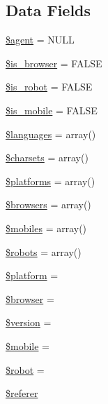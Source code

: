 \subsection*{Data Fields}
\begin{DoxyCompactItemize}
\item 
\hyperlink{class_c_i___user__agent_a0606e5b321c8c85527efdd1c17a9a569}{\$agent} = N\+U\+L\+L
\item 
\hyperlink{class_c_i___user__agent_af9608f790bc03edf6c152d11cd879e04}{\$is\+\_\+browser} = F\+A\+L\+S\+E
\item 
\hyperlink{class_c_i___user__agent_a4b3d4b92832b15f313661bc9af0323fa}{\$is\+\_\+robot} = F\+A\+L\+S\+E
\item 
\hyperlink{class_c_i___user__agent_a15f8c9cdaac57894151997b80f38224d}{\$is\+\_\+mobile} = F\+A\+L\+S\+E
\item 
\hyperlink{class_c_i___user__agent_a8856d0a49881ef8e0a6d205d37d4a7af}{\$languages} = array()
\item 
\hyperlink{class_c_i___user__agent_ae269ee30c94deb9b791c1ae5489b88f3}{\$charsets} = array()
\item 
\hyperlink{class_c_i___user__agent_a1c1a0a860242698ee6b3f4ef7d6eb343}{\$platforms} = array()
\item 
\hyperlink{class_c_i___user__agent_a81edf933083b5ac5b380385f59074a7d}{\$browsers} = array()
\item 
\hyperlink{class_c_i___user__agent_a6928dde5aa0be443766d5b2376de908a}{\$mobiles} = array()
\item 
\hyperlink{class_c_i___user__agent_a5752e2a66d1c03bc34666492746037ab}{\$robots} = array()
\item 
\hyperlink{class_c_i___user__agent_a9cb2b1a2275f65f39415f0366139fb1c}{\$platform} = \textquotesingle{}\textquotesingle{}
\item 
\hyperlink{class_c_i___user__agent_ada6112ba48917a0c8cc154ed90908b28}{\$browser} = \textquotesingle{}\textquotesingle{}
\item 
\hyperlink{class_c_i___user__agent_a17c8948c68aa44fa9961ae169b6a8961}{\$version} = \textquotesingle{}\textquotesingle{}
\item 
\hyperlink{class_c_i___user__agent_a4144d0c9c54f204811328b221f06fc3d}{\$mobile} = \textquotesingle{}\textquotesingle{}
\item 
\hyperlink{class_c_i___user__agent_aaf86508e45876d0081cadac4cb8a8808}{\$robot} = \textquotesingle{}\textquotesingle{}
\item 
\hyperlink{class_c_i___user__agent_a872d93ddbbb879ab5c0eb29261a520a4}{\$referer}
\end{DoxyCompactItemize}
